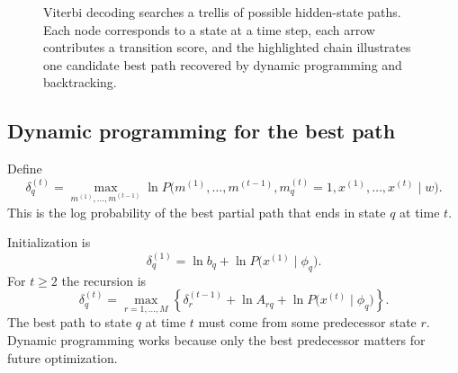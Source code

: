 \begin{figure}[htbp]
  \centering
  \caption{Viterbi decoding searches a trellis of possible hidden-state paths. Each node corresponds to a state at a time step, each arrow contributes a transition score, and the highlighted chain illustrates one candidate best path recovered by dynamic programming and backtracking.}
\end{figure}

\subsection{Dynamic programming for the best path}

Define
\[
  \delta_q^{(t)}
  =
  \max_{m^{(1)},\dots,m^{(t-1)}}
  \ln P\bigl(m^{(1)},\dots,m^{(t-1)},m_q^{(t)}=1,x^{(1)},\dots,x^{(t)}\mid w\bigr).
\]
This is the log probability of the best partial path that ends in state $q$ at time $t$.

Initialization is
\[
  \delta_q^{(1)}
  =
  \ln b_q + \ln P\bigl(x^{(1)}\mid \phi_q\bigr).
\]
For $t\ge 2$ the recursion is
\[
  \delta_q^{(t)}
  =
  \max_{r=1,\dots,M}
  \left\{
    \delta_r^{(t-1)} + \ln A_{rq} + \ln P\bigl(x^{(t)}\mid \phi_q\bigr)
  \right\}.
\]
The best path to state $q$ at time $t$ must come from some predecessor state $r$. Dynamic programming works because only the best predecessor matters for future optimization.

